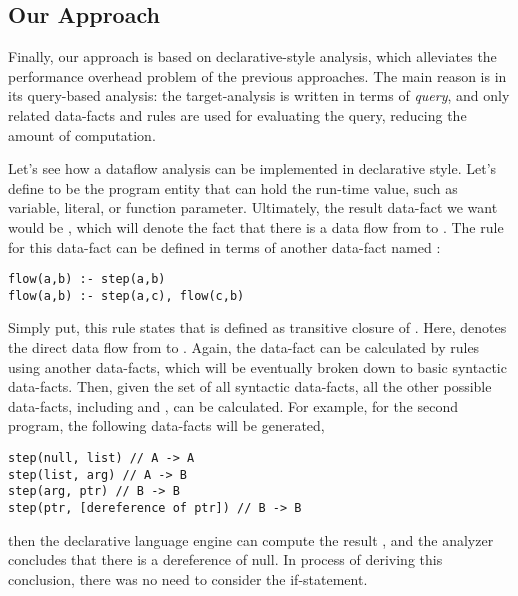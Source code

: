 \subsection{Our Approach}

Finally, our approach is based on declarative-style analysis, which
alleviates the performance overhead problem of the previous approaches.
The main reason is in its query-based analysis: the target-analysis is
written in terms of \textit{query}, and only related data-facts and rules
are used for evaluating the query, reducing the amount of computation.

Let's see how a dataflow analysis can be implemented in declarative style.
Let's define  to be the program entity that can hold the run-time
value, such as variable, literal, or function parameter.  Ultimately, the
result data-fact we want would be , which will denote the
fact that there is a data flow from  to . The
rule for this data-fact can be defined in terms of another data-fact named
:

\begin{lstlisting}[style=myDatalog,xleftmargin=2.5em]
flow(a,b) :- step(a,b)
flow(a,b) :- step(a,c), flow(c,b)
\end{lstlisting}

Simply put, this rule states that  is defined as transitive
closure of .  Here,  denotes the direct data
flow from  to . Again, the data-fact
 can be calculated by rules using another data-facts, which will
be eventually broken down to basic syntactic data-facts.  Then, given the set
of all syntactic data-facts, all the other possible data-facts, including
 and , can be calculated. For example, for the
second program, the following data-facts will be generated,

\begin{lstlisting}[style=myDatalog,xleftmargin=2.5em]
step(null, list) // A -> A
step(list, arg) // A -> B
step(arg, ptr) // B -> B
step(ptr, [dereference of ptr]) // B -> B
\end{lstlisting}

then the declarative language engine can compute the result , and the analyzer concludes that there is a dereference
of null. In process of deriving this conclusion, there was no need to consider
the if-statement.

